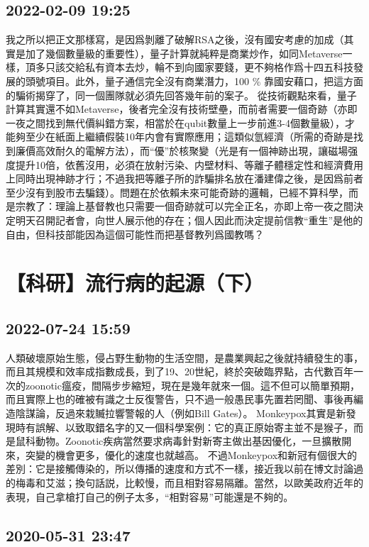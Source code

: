 \documentclass[twocolumn]{ctexart}
\begin{document}
\subsection*{2022-02-09 19:25}

我之所以把正文那樣寫，是因爲剝離了破解RSA之後，沒有國安考慮的加成（其實是加了幾個數量級的重要性），量子計算就純粹是商業炒作，如同Metaverse一樣，頂多只該交給私有資本去炒，輪不到向國家要錢，更不夠格作爲十四五科技發展的頭號項目。此外，量子通信完全沒有商業潛力，100 \% 靠國安藉口，把這方面的騙術揭穿了，同一個團隊就必須先回答幾年前的案子。
從技術觀點來看，量子計算其實還不如Metaverse，後者完全沒有技術壁壘，而前者需要一個奇跡（亦即一夜之間找到無代價糾錯方案，相當於在qubit數量上一步前進3-4個數量級），才能夠至少在紙面上繼續假裝10年内會有實際應用；這類似氫經濟（所需的奇跡是找到廉價高效耐久的電解方法），而“優”於核聚變（光是有一個神跡出現，讓磁場强度提升10倍，依舊沒用，必須在放射污染、内壁材料、等離子體穩定性和經濟費用上同時出現神跡才行；不過我把等離子所的詐騙排名放在潘建偉之後，是因爲前者至少沒有到股市去騙錢）。問題在於依賴未來可能奇跡的邏輯，已經不算科學，而是宗教了：理論上基督教也只需要一個奇跡就可以完全正名，亦即上帝一夜之間決定明天召開記者會，向世人展示他的存在；個人因此而決定提前信教“重生”是他的自由，但科技部能因為這個可能性而把基督教列爲國教嗎？
\section*{【科研】流行病的起源（下）}
\subsection*{2022-07-24 15:59}

人類破壞原始生態，侵占野生動物的生活空間，是農業興起之後就持續發生的事，而且其規模和效率成指數成長，到了19、20世紀，終於突破臨界點，古代數百年一次的zoonotic瘟疫，間隔步步縮短，現在是幾年就來一個。這不但可以簡單預期，而且實際上也的確被有識之士反復警告，只不過一般愚民事先置若罔聞、事後再編造陰謀論，反過來栽贓拉響警報的人（例如Bill Gates）。
Monkeypox其實是新發現時有誤解、以致取錯名字的又一個科學案例：它的真正原始寄主並不是猴子，而是鼠科動物。Zoonotic疾病當然要求病毒針對新寄主做出基因優化，一旦擴散開來，突變的機會更多，優化的速度也就越高。
不過Monkeypox和新冠有個很大的差別：它是接觸傳染的，所以傳播的速度和方式不一樣，接近我以前在博文討論過的梅毒和艾滋；換句話説，比較慢，而且相對容易隔離。當然，以歐美政府近年的表現，自己拿槍打自己的例子太多，“相對容易”可能還是不夠的。
\subsection*{2020-05-31 23:47}
\end{document}

